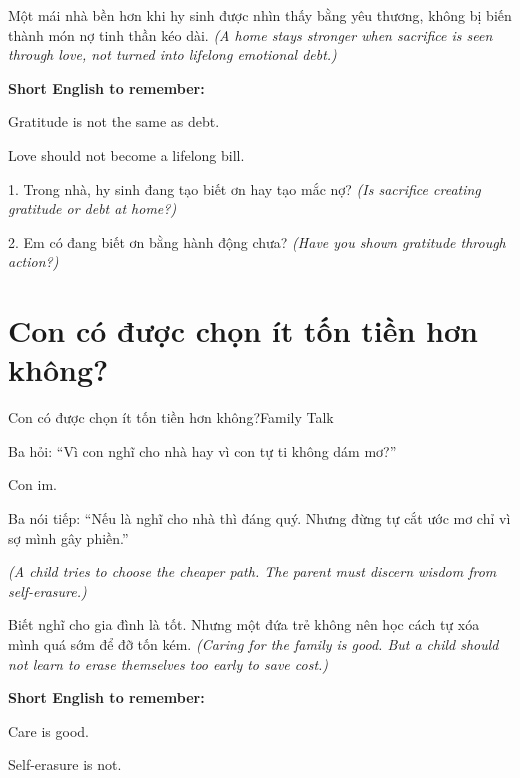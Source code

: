 \begin{baihoc}
Một mái nhà bền hơn khi hy sinh được nhìn thấy bằng yêu thương, không bị biến thành món nợ tinh thần kéo dài.
\textit{(A home stays stronger when sacrifice is seen through love, not turned into lifelong emotional debt.)}
\end{baihoc}

\begin{ghinhoanh}
\textbf{Short English to remember:}

Gratitude is not the same as debt.

Love should not become a lifelong bill.
\end{ghinhoanh}

\begin{tuhocnhanh}
1. Trong nhà, hy sinh đang tạo biết ơn hay tạo mắc nợ? \textit{(Is sacrifice creating gratitude or debt at home?)}

2. Em có đang biết ơn bằng hành động chưa? \textit{(Have you shown gratitude through action?)}
\end{tuhocnhanh}
\ngancach

\section{Con có được chọn ít tốn tiền hơn không?}
\begin{truyen}{Con có được chọn ít tốn tiền hơn không?}{Family Talk}

Ba hỏi: ``Vì con nghĩ cho nhà hay vì con tự ti không dám mơ?''

Con im.

Ba nói tiếp: ``Nếu là nghĩ cho nhà thì đáng quý. Nhưng đừng tự cắt ước mơ chỉ vì sợ mình gây phiền.''

\textit{(A child tries to choose the cheaper path. The parent must discern wisdom from self-erasure.)}
\end{truyen}

\begin{baihoc}
Biết nghĩ cho gia đình là tốt. Nhưng một đứa trẻ không nên học cách tự xóa mình quá sớm để đỡ tốn kém.
\textit{(Caring for the family is good. But a child should not learn to erase themselves too early to save cost.)}
\end{baihoc}

\begin{ghinhoanh}
\textbf{Short English to remember:}

Care is good.

Self-erasure is not.
\end{ghinhoanh}

